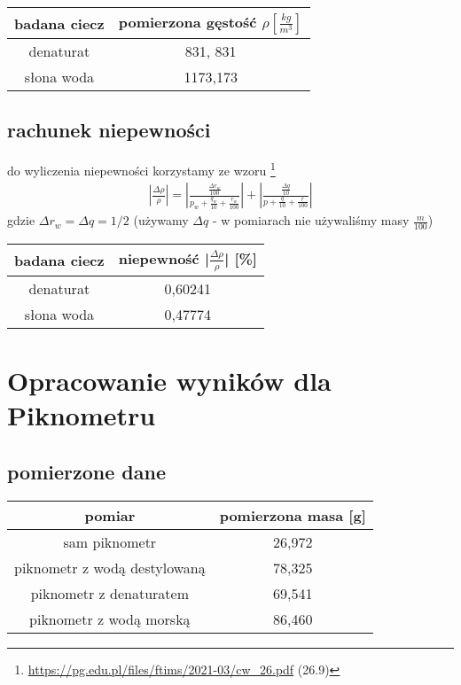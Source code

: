 \documentclass{article}
\begin{document}
\begin{center}
\begin{tabular}{ c | c }
badana ciecz & pomierzona gęstość $\rho [\frac{kg}{m^3}]$\\
\hline
 denaturat  & 831, 831\\  
 słona woda & 1173,173
\end{tabular}
\end{center}

\subsection{rachunek niepewności}
do wyliczenia niepewności korzystamy ze wzoru \footnote{\url{https://pg.edu.pl/files/ftims/2021-03/cw_26.pdf} (26.9)}
\begin{gather*}
	|\frac{\Delta \rho}{\rho}| = |\frac{\frac{\Delta r_w}{100}}{p_w+\frac{q_w}{10} + \frac{r_w}{100}}| + |\frac{\frac{\Delta q}{10}}{p+\frac{q}{10} + \frac{r}{100}}|
\end{gather*}
gdzie $\Delta r_w = \Delta q = 1/2$ (używamy $\Delta q$ - w pomiarach nie używaliśmy masy $\frac{m}{100}$)

\begin{center}
\begin{tabular}{ c | c }
badana ciecz & niepewność |$\frac{\Delta \rho}{\rho}$| [\%] \\
\hline
denaturat  & 0,60241\\  
słona woda & 0,47774
\end{tabular}
\end{center}

\section{Opracowanie wyników dla Piknometru}

\subsection{pomierzone dane}
\begin{center}
\begin{tabular}{ c | c }
pomiar & pomierzona masa [g]  \\
\hline
sam piknometr &  26,972  \\ 
piknometr z wodą destylowaną& 78,325  \\  
piknometr z denaturatem & 69,541 \\
piknometr z wodą morską & 86,460    
\end{tabular}
\end{center}
\end{document}
